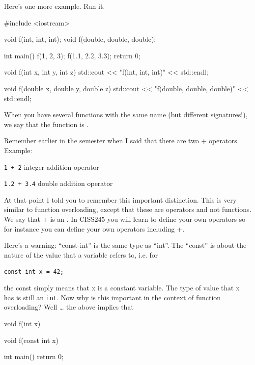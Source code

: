 Here's one more example. Run it.

\begin{consolethree}[escapeinside=||]
#include <iostream>

void f(int, int, int);
void f(double, double, double);

int main()
{
    f(1, 2, 3);
    f(1.1, 2.2, 3.3);
    return 0;
}

void f(int x, int y, int z)
{
    std::cout << "f(int, int, int)" << std::endl;
}

void f(double x, double y, double z)
{
    std::cout << "f(double, double, double)"
              << std::endl;
}
\end{consolethree}

When you have several functions with the same name (but different signatures!), we say that the function is .




Remember earlier in the semester when I said that there are two + operators. Example:

\verb!1 + 2! integer addition operator

\verb!1.2 + 3.4! double addition operator

At that point I told you to remember this important distinction. This is very similar to function overloading, except that these are operators and not functions. We say that + is an . In CISS245 you will learn to define your own operators so for instance you can define your own operators including +.


\newpage{}

Here's a warning: ``const int'' is the same type as ``int''. The ``const'' is about the nature of the value that a variable refers to, i.e. for

\verb!const int x = 42;!

the const simply means that x is a constant variable. The type of value that x has is still an \texttt{int}. Now why is this important in the context of function overloading? Well \ldots{} the above implies that

\begin{consolethree}[escapeinside=||]
void f(int x)
{
}

void f(const int x)
{
}

int main()
{
    return 0;
}
\end{consolethree}

